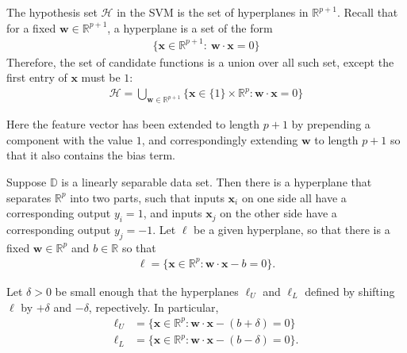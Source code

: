 \documentclass[12pt]{article}
\begin{document}
\begin{enumerate}


The hypothesis set $\mathcal{H}$ in the SVM is the set of hyperplanes in $\mathbb{R}^{p+1}$.
Recall that for a fixed $\mathbf{w}\in\mathbb{R}^{p+1}$, a hyperplane is a set of the form
\begin{align*}
	\{\mathbf{x}\in\mathbb{R}^{p+1}:\ \mathbf{w}\cdot\mathbf{x}=0\}
\end{align*}
Therefore, the set of candidate functions is a union over all such set, except
the first entry of $\mathbf{x}$ must be $1$:
\begin{align*}
	\mathcal{H}=\bigcup_{\mathbf{w}\in \mathbb{R}^{p+1}}\{\mathbf{x}\in \{1\}\times \mathbb{R}^p:
	\mathbf{w}\cdot \mathbf{x}=0 \}
\end{align*}

Here the feature vector has been extended to length $p+1$ by prepending a component with the
value $1$, and correspondingly extending $\mathbf{w}$ to length $p+1$ so that it also
contains the bias term.



Suppose $\mathbb{D}$ is a linearly separable data set. Then there is a hyperplane that separates
$\mathbb{R}^p$ into two parts, such that inputs $\mathbf{x}_i$ on one side all have a corresponding
output $y_i=1$, and inputs $\mathbf{x}_j$ on the other side have a corresponding output $y_j=-1$.
Let $\ell$ be a given hyperplane, so that there is a fixed $\mathbf{w}\in\mathbb{R}^{p}$ and $b\in\mathbb{R}$
so that
\begin{align*}
	\ell = \{\mathbf{x}\in\mathbb{R}^p: \mathbf{w}\cdot \mathbf{x}-b=0\}.
\end{align*}

Let $\delta>0$ be small enough that the hyperplanes $\ell_U$ and $\ell_L$ defined by shifting
$\ell$ by $+\delta$ and $-\delta$, repectively. In particular,
\begin{align*}
	\ell_U &= \{\mathbf{x}\in\mathbb{R}^p: \mathbf{w}\cdot \mathbf{x}-(b+\delta)=0\}\\
	\ell_L &= \{\mathbf{x}\in\mathbb{R}^p: \mathbf{w}\cdot \mathbf{x}-(b-\delta)=0\}.
\end{align*}


\end{enumerate}
\end{document}
